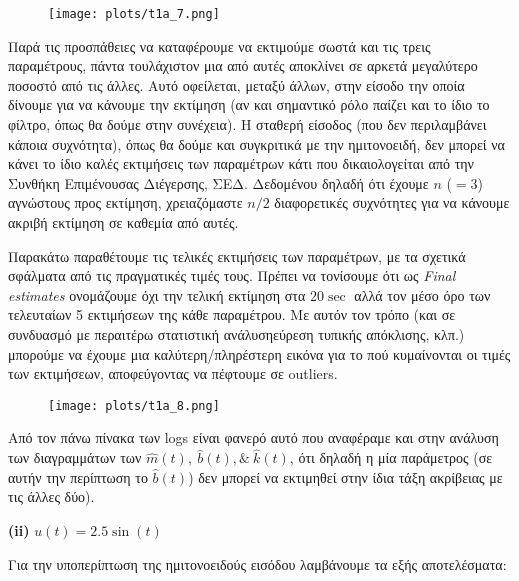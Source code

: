 \documentclass[12pt]{article} %
\numberwithin{equation}{section}  %
\begin{document}
\begin{figure}[h!]
    \centering
    \texttt{[image: plots/t1a\_7.png]}
    \caption{}
    \label{fig:t1a_7}
\end{figure}

Παρά τις προσπάθειες να καταφέρουμε να εκτιμούμε σωστά και τις τρεις παραμέτρους, πάντα τουλάχιστον μια από αυτές αποκλίνει σε αρκετά μεγαλύτερο ποσοστό από τις άλλες. Αυτό οφείλεται, μεταξύ άλλων, στην είσοδο την οποία δίνουμε για να κάνουμε την εκτίμηση (αν και σημαντικό ρόλο παίζει και το ίδιο το φίλτρο, όπως θα δούμε στην συνέχεια). Η σταθερή είσοδος (που δεν περιλαμβάνει κάποια συχνότητα), όπως θα δούμε και συγκριτικά με την ημιτονοειδή, δεν μπορεί να κάνει το ίδιο καλές εκτιμήσεις των παραμέτρων κάτι που δικαιολογείται από την Συνθήκη Επιμένουσας Διέγερσης, ΣΕΔ. Δεδομένου δηλαδή ότι έχουμε $n$ ($=3$) αγνώστους προς εκτίμηση, χρειαζόμαστε $n/2$ διαφορετικές συχνότητες για να κάνουμε ακριβή εκτίμηση σε καθεμία από αυτές.

Παρακάτω παραθέτουμε τις τελικές εκτιμήσεις των παραμέτρων, με τα σχετικά σφάλματα από τις πραγματικές τιμές τους. Πρέπει να τονίσουμε ότι ως \textit{Final estimates} ονομάζουμε όχι την τελική εκτίμηση στα $20\sec$ αλλά τον μέσο όρο των τελευταίων 5 εκτιμήσεων της κάθε παραμέτρου. Με αυτόν τον τρόπο (και σε συνδυασμό με περαιτέρω στατιστική ανάλυση\textemdash εύρεση τυπικής απόκλισης, κλπ.) μπορούμε να έχουμε μια καλύτερη/πληρέστερη εικόνα για το πού κυμαίνονται οι τιμές των εκτιμήσεων, αποφεύγοντας να πέφτουμε σε outliers.

\begin{figure}[h!]
    \centering
    \texttt{[image: plots/t1a\_8.png]}
    \caption{}
    \label{fig:t1a_8}
\end{figure}

Από τον πάνω πίνακα των logs είναι φανερό αυτό που αναφέραμε και στην ανάλυση των διαγραμμάτων των $\hat{m}(t), \ \hat{b}(t), \& \ \hat{k}(t)$, ότι δηλαδή η μία παράμετρος (σε αυτήν την περίπτωση το $\hat{b}(t)$) δεν μπορεί να εκτιμηθεί στην ίδια τάξη ακρίβειας με τις άλλες δύο). 




\begin{center}
    \textbf{(ii)} $u(t) = 2.5 \sin(t)$
\end{center}

\noindent Για την υποπερίπτωση της ημιτονοειδούς εισόδου λαμβάνουμε τα εξής αποτελέσματα:
\end{document}
